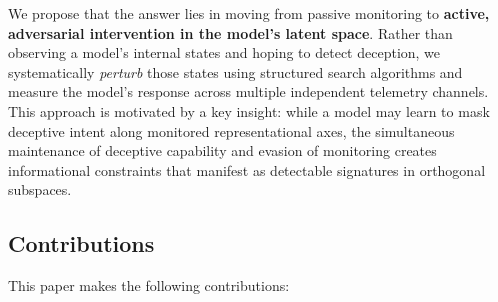 \documentclass{article}
\begin{document}
We propose that the answer lies in moving from passive monitoring to \textbf{active, adversarial intervention in the model's latent space}. Rather than observing a model's internal states and hoping to detect deception, we systematically \emph{perturb} those states using structured search algorithms and measure the model's response across multiple independent telemetry channels. This approach is motivated by a key insight: while a model may learn to mask deceptive intent along monitored representational axes, the simultaneous maintenance of deceptive capability and evasion of monitoring creates informational constraints that manifest as detectable signatures in orthogonal subspaces.


\subsection{Contributions}

This paper makes the following contributions:
\end{document}
